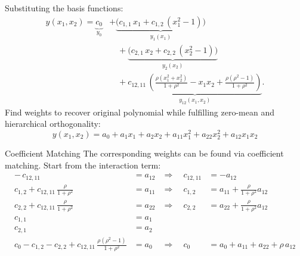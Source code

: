 \begin{frame}
  Substituting the basis functions:
  \begin{align*}
   y(x_1,x_2)  = \underbrace{c_0}_{y_0}
   &+ \underbrace{\big(c_{1,1}\,x_1 
                     + c_{1,2}\,(x_1^2 - 1)\big)}_{y_1(x_1)} \\[0.5em]
   &\quad
   + \underbrace{\big(c_{2,1}\,x_2 
                     + c_{2,2}\,(x_2^2 - 1)\big)}_{y_2(x_2)} \\[0.5em]
   &\quad
   + \underbrace{c_{12,11}\,\left(\frac{\rho (x_1^2 + x_2^2)}{1 + \rho^2} 
                         - x_1 x_2 
                         + \frac{\rho(\rho^2 - 1)}{1 + \rho^2}\right)}_{y_{12}(x_1,x_2)}.
\end{align*}
Find weights to recover original polynomial while fulfilling zero-mean and hierarchical orthogonality:
\[
y(x_1,x_2) = a_0 + a_1 x_1 + a_2 x_2 
   + a_{11} x_1^2 + a_{22} x_2^2 + a_{12} x_1 x_2 
\]

\end{frame}

\begin{frame}{Coefficient Matching}
  The corresponding weights can be found via coefficient matching. Start from the interaction term:
      \begin{align*}
-\,c_{12, 11} &= a_{12} &\Rightarrow\quad c_{12, 11} &= -a_{12} \\[0.5em]
c_{1,2} + c_{12, 11}\,\tfrac{\rho}{1+\rho^2} &= a_{11} 
&\Rightarrow\quad c_{1,2} &= a_{11} + \tfrac{\rho}{1+\rho^2}a_{12} \\[0.5em]
c_{2,2} + c_{12, 11}\,\tfrac{\rho}{1+\rho^2} &= a_{22} 
&\Rightarrow\quad c_{2,2} &= a_{22} + \tfrac{\rho}{1+\rho^2}a_{12} \\[0.5em]
c_{1,1} &= a_1 \\[0.5em]
c_{2,1} &= a_2 \\[0.5em]
c_0 - c_{1,2} - c_{2,2} + c_{12, 11}\,\tfrac{\rho(\rho^2 - 1)}{1+\rho^2} &= a_0 
&\Rightarrow\quad 
c_0 &= a_0 + a_{11} + a_{22} + \rho\,a_{12}
\end{align*}
\end{frame}

